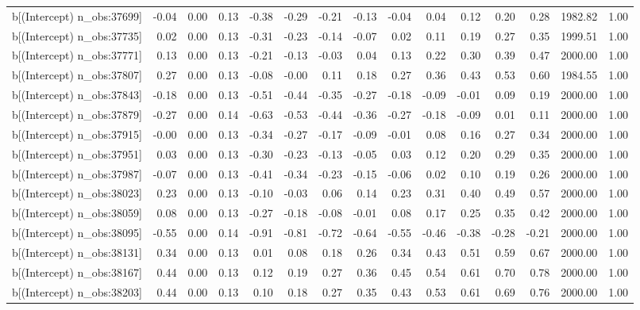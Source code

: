 \begin{table}[ht]
\begin{tabular}{rrrrrrrrrrrrrrr}
  b[(Intercept) n\_obs:37699] & -0.04 & 0.00 & 0.13 & -0.38 & -0.29 & -0.21 & -0.13 & -0.04 & 0.04 & 0.12 & 0.20 & 0.28 & 1982.82 & 1.00 \\ 
  b[(Intercept) n\_obs:37735] & 0.02 & 0.00 & 0.13 & -0.31 & -0.23 & -0.14 & -0.07 & 0.02 & 0.11 & 0.19 & 0.27 & 0.35 & 1999.51 & 1.00 \\ 
  b[(Intercept) n\_obs:37771] & 0.13 & 0.00 & 0.13 & -0.21 & -0.13 & -0.03 & 0.04 & 0.13 & 0.22 & 0.30 & 0.39 & 0.47 & 2000.00 & 1.00 \\ 
  b[(Intercept) n\_obs:37807] & 0.27 & 0.00 & 0.13 & -0.08 & -0.00 & 0.11 & 0.18 & 0.27 & 0.36 & 0.43 & 0.53 & 0.60 & 1984.55 & 1.00 \\ 
  b[(Intercept) n\_obs:37843] & -0.18 & 0.00 & 0.13 & -0.51 & -0.44 & -0.35 & -0.27 & -0.18 & -0.09 & -0.01 & 0.09 & 0.19 & 2000.00 & 1.00 \\ 
  b[(Intercept) n\_obs:37879] & -0.27 & 0.00 & 0.14 & -0.63 & -0.53 & -0.44 & -0.36 & -0.27 & -0.18 & -0.09 & 0.01 & 0.11 & 2000.00 & 1.00 \\ 
  b[(Intercept) n\_obs:37915] & -0.00 & 0.00 & 0.13 & -0.34 & -0.27 & -0.17 & -0.09 & -0.01 & 0.08 & 0.16 & 0.27 & 0.34 & 2000.00 & 1.00 \\ 
  b[(Intercept) n\_obs:37951] & 0.03 & 0.00 & 0.13 & -0.30 & -0.23 & -0.13 & -0.05 & 0.03 & 0.12 & 0.20 & 0.29 & 0.35 & 2000.00 & 1.00 \\ 
  b[(Intercept) n\_obs:37987] & -0.07 & 0.00 & 0.13 & -0.41 & -0.34 & -0.23 & -0.15 & -0.06 & 0.02 & 0.10 & 0.19 & 0.26 & 2000.00 & 1.00 \\ 
  b[(Intercept) n\_obs:38023] & 0.23 & 0.00 & 0.13 & -0.10 & -0.03 & 0.06 & 0.14 & 0.23 & 0.31 & 0.40 & 0.49 & 0.57 & 2000.00 & 1.00 \\ 
  b[(Intercept) n\_obs:38059] & 0.08 & 0.00 & 0.13 & -0.27 & -0.18 & -0.08 & -0.01 & 0.08 & 0.17 & 0.25 & 0.35 & 0.42 & 2000.00 & 1.00 \\ 
  b[(Intercept) n\_obs:38095] & -0.55 & 0.00 & 0.14 & -0.91 & -0.81 & -0.72 & -0.64 & -0.55 & -0.46 & -0.38 & -0.28 & -0.21 & 2000.00 & 1.00 \\ 
  b[(Intercept) n\_obs:38131] & 0.34 & 0.00 & 0.13 & 0.01 & 0.08 & 0.18 & 0.26 & 0.34 & 0.43 & 0.51 & 0.59 & 0.67 & 2000.00 & 1.00 \\ 
  b[(Intercept) n\_obs:38167] & 0.44 & 0.00 & 0.13 & 0.12 & 0.19 & 0.27 & 0.36 & 0.45 & 0.54 & 0.61 & 0.70 & 0.78 & 2000.00 & 1.00 \\ 
  b[(Intercept) n\_obs:38203] & 0.44 & 0.00 & 0.13 & 0.10 & 0.18 & 0.27 & 0.35 & 0.43 & 0.53 & 0.61 & 0.69 & 0.76 & 2000.00 & 1.00 \\ 

\end{tabular}
\end{table}
